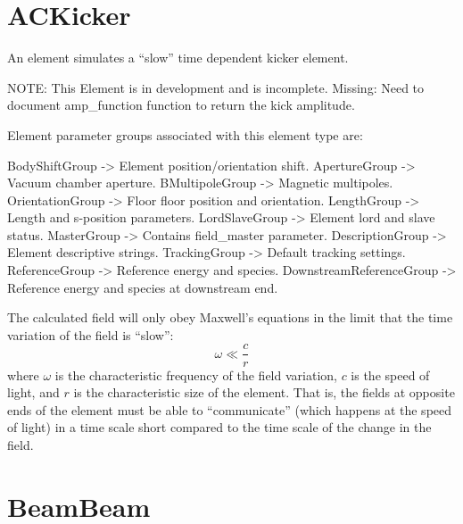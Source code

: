 \newpage

\section{ACKicker}
\label{s:ackicker}

An  element simulates a ``slow'' time dependent kicker element.

NOTE: This Element is in development and is incomplete. 
Missing: Need to document amp_function function to return the kick amplitude.

Element parameter groups associated with this element type are:
\TOPrule 
\begin{example}
  BodyShiftGroup     -> Element position/orientation shift.  
  ApertureGroup      -> Vacuum chamber aperture.  
  BMultipoleGroup    -> Magnetic multipoles.  
  OrientationGroup -> Floor floor position and orientation.  
  LengthGroup        -> Length and s-position parameters.  
  LordSlaveGroup     -> Element lord and slave status.  
  MasterGroup        -> Contains field_master parameter.  
  DescriptionGroup   -> Element descriptive strings.  
  TrackingGroup      -> Default tracking settings.  
  ReferenceGroup     -> Reference energy and species. 
  DownstreamReferenceGroup -> Reference energy and species at downstream end. 
\end{example}
\BOTTOMrule


The calculated field will only obey Maxwell's equations in the limit that the time variation
of the field is ``slow'':
\begin{equation}
  \omega \ll \frac{c}{r}
\end{equation}
where $\omega$ is the characteristic frequency of the field variation, $c$ is the speed of light,
and $r$ is the characteristic size of the  element. That is, the fields at opposite
ends of the element must be able to ``communicate'' (which happens at the speed of light) in a time
scale short compared to the time scale of the change in the field.

\newpage

\section{BeamBeam}
\label{s:beambeam}

